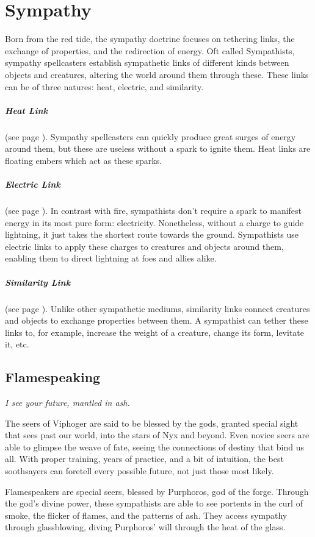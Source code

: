 \section{Sympathy} \label{sec::sympathy} %
Born from the red tide, the sympathy doctrine focuses on tethering links, the exchange of properties, and the redirection of energy.
Oft called Sympathists, sympathy spellcasters establish sympathetic links of different kinds between objects and creatures, altering the world around them through these.
These links can be of three natures: heat, electric, and similarity.

\subparagraph{Heat Link}
    (see page \pageref{medium::ember}).
    Sympathy spellcasters can quickly produce great surges of energy around them, but these are useless without a spark to ignite them.
    Heat links are floating embers which act as these sparks.

\subparagraph{Electric Link}
    (see page \pageref{medium::charge}).
    In contrast with fire, sympathists don't require a spark to manifest energy in its most pure form: electricity.
    Nonetheless, without a charge to guide lightning, it just takes the shortest route towards the ground.
    Sympathists use electric links to apply these charges to creatures and objects around them, enabling them to direct lightning at foes and allies alike.

\subparagraph{Similarity Link}
    (see page \pageref{medium::tether}).
    Unlike other sympathetic mediums, similarity links connect creatures and objects to exchange properties between them.
    A sympathist can tether these links to, for example, increase the weight of a creature, change its form, levitate it, etc.

\subsection*{Flamespeaking} \label{ssec::flamespeaking} %
    \textit{I see your future, mantled in ash.}

    The seers of Viphoger are said to be blessed by the gods, granted special sight that sees past our world, into the stars of Nyx and beyond.
    Even novice seers are able to glimpse the weave of fate, seeing the connections of destiny that bind us all.
    With proper training, years of practice, and a bit of intuition, the best soothsayers can foretell every possible future, not just those most likely.

    Flamespeakers are special seers, blessed by Purphoros, god of the forge.
    Through the god's divine power, these sympathists are able to see portents in the curl of smoke, the flicker of flames, and the patterns of ash.
    They access sympathy through glassblowing, diving Purphoros' will through the heat of the glass.

